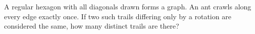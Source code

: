 A regular hexagon with all diagonals drawn forms a graph. An ant crawls along every edge exactly once. If two such trails differing only by a rotation are considered the same, how many distinct trails are there?
